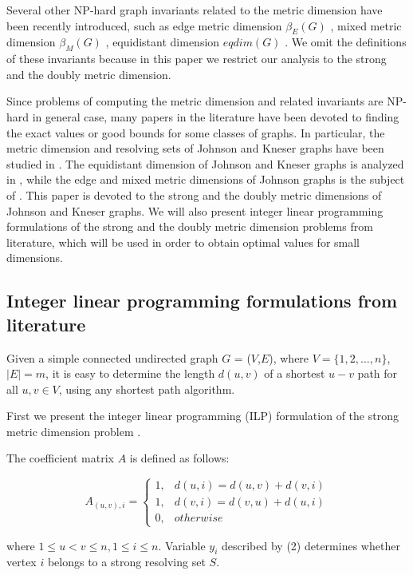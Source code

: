 \documentclass[preprint,12pt]{elsarticle}
\begin{document}
Several other NP-hard graph invariants related to the metric dimension have been recently introduced, 
such as edge metric dimension $\beta_E(G)$ \cite{kel18}, mixed metric dimension $\beta_M(G)$ \cite{kel17}, 
equidistant dimension $eqdim(G)$ \cite{eqdim1}. We omit the definitions of these invariants 
because in this paper we restrict our analysis to the strong and the doubly metric dimension.

Since problems of computing the metric dimension and related invariants are NP-hard in
general case, many papers in the literature have been devoted to finding
the exact values or good bounds for some classes of graphs. In particular, the metric
dimension and resolving sets of Johnson and Kneser graphs have been studied in
\cite{metdj2,metdj1}. The equidistant dimension of Johnson and Kneser graphs is analyzed in 
\cite{eqdj}, while the edge  and mixed metric dimensions of Johnson graphs is the 
subject of \cite{emetdj}. This paper is devoted to the strong and the doubly metric dimensions of 
Johnson and Kneser graphs. We will also present integer linear programming formulations of the strong and the doubly 
metric dimension problems from literature, which will be used in order to obtain 
optimal values for small dimensions.

\subsection{Integer linear programming formulations from literature}

Given a simple connected undirected graph $G$ = ($V$,$E$), where
$V=\{1,2,\dots,n\}$, $|E|=m$, it is easy to determine the length
$d(u,v)$ of a shortest $u-v$ path for all $u,v \in V$, using any
shortest path algorithm.

First we present the integer linear programming (ILP) formulation of the strong metric dimension problem
\cite{ilps}. 

The coefficient matrix $A$ is defined as follows:

\begin{equation} \label{ilpsp}
A_{(u,v),i}  =\begin{cases}
1, & d(u,i) = d(u,v) + d(v,i)\\
1, & d(v,i) = d(v,u) + d(u,i)\\
0, & otherwise
\end{cases}
\end{equation}

where $1 \leq u < v \leq n, 1 \leq i \leq n$. Variable $y_i$
described by (2) determines whether vertex $i$ belongs to a strong
resolving set $S$.
\end{document}
